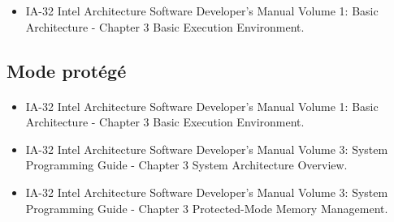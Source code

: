 \documentclass[10pt,a4wide]{article}
\begin{document}
\begin{itemize}
\item IA-32 Intel Architecture Software Developer's Manual Volume 1:
      Basic Architecture - Chapter 3 Basic Execution Environment.
\end{itemize}

\subsection{Mode prot\'eg\'e}

\paragraph{}

\begin{itemize}
\item IA-32 Intel Architecture Software Developer's Manual Volume 1:
      Basic Architecture - Chapter 3 Basic Execution Environment.
\item IA-32 Intel Architecture Software Developer's Manual Volume 3:
      System Programming Guide - Chapter 3 System Architecture Overview.
\item IA-32 Intel Architecture Software Developer's Manual Volume 3:
      System Programming Guide - Chapter 3 Protected-Mode Memory Management.
\end{itemize}
\end{document}
